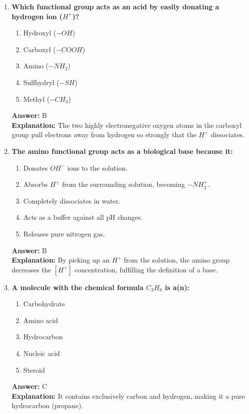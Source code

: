 \documentclass[11pt, a4paper]{article}
\begin{document}
\begin{enumerate}
\item \textbf{Which functional group acts as an acid by easily donating a hydrogen ion ($H^+$)?}
\begin{enumerate}[label=\Alph*.]
    \item Hydroxyl ($-OH$)
    \item Carboxyl ($-COOH$)
    \item Amino ($-NH_2$)
    \item Sulfhydryl ($-SH$)
    \item Methyl ($-CH_3$)
\end{enumerate}
\textbf{Answer:} B \\
\textbf{Explanation:} The two highly electronegative oxygen atoms in the carboxyl group pull electrons away from hydrogen so strongly that the $H^+$ dissociates.

\item \textbf{The amino functional group acts as a biological base because it:}
\begin{enumerate}[label=\Alph*.]
    \item Donates $OH^-$ ions to the solution.
    \item Absorbs $H^+$ from the surrounding solution, becoming $-NH_3^+$.
    \item Completely dissociates in water.
    \item Acts as a buffer against all pH changes.
    \item Releases pure nitrogen gas.
\end{enumerate}
\textbf{Answer:} B \\
\textbf{Explanation:} By picking up an $H^+$ from the solution, the amino group decreases the $[H^+]$ concentration, fulfilling the definition of a base.

\item \textbf{A molecule with the chemical formula $C_3H_8$ is a(n):}
\begin{enumerate}[label=\Alph*.]
    \item Carbohydrate
    \item Amino acid
    \item Hydrocarbon
    \item Nucleic acid
    \item Steroid
\end{enumerate}
\textbf{Answer:} C \\
\textbf{Explanation:} It contains exclusively carbon and hydrogen, making it a pure hydrocarbon (propane).


\end{enumerate}
\end{document}

